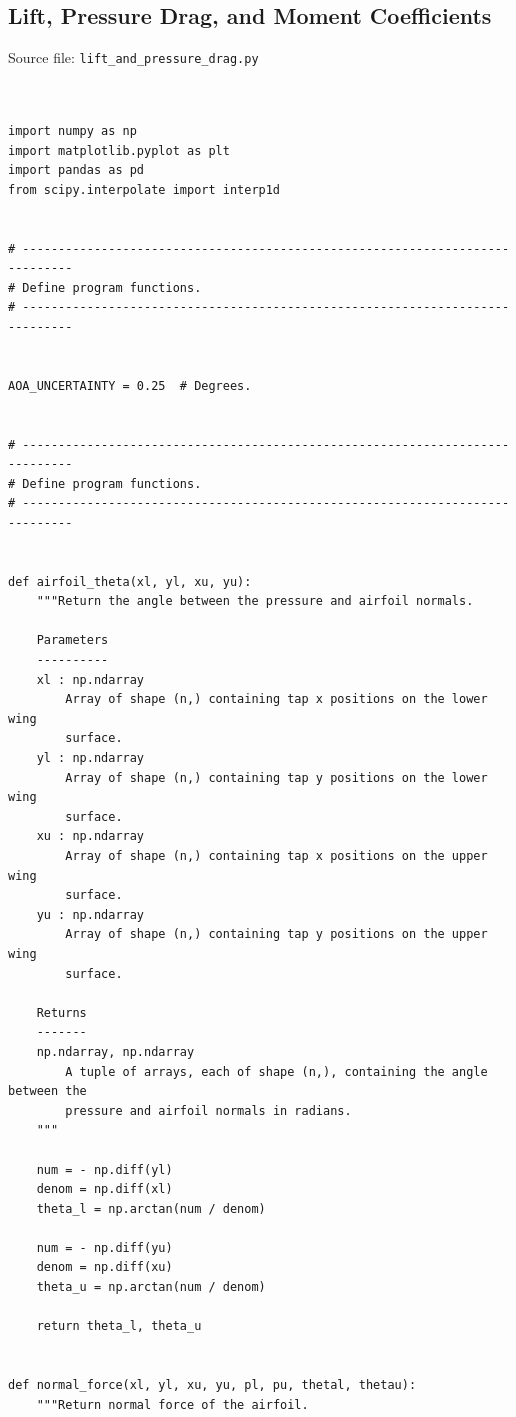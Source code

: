 \documentclass[runningheads]{llncs}
\begin{document}
\subsection{Lift, Pressure Drag, and Moment Coefficients}

Source file: \verb|lift_and_pressure_drag.py|

\begin{verbatim}


import numpy as np
import matplotlib.pyplot as plt
import pandas as pd
from scipy.interpolate import interp1d


# -----------------------------------------------------------------------------
# Define program functions.
# -----------------------------------------------------------------------------


AOA_UNCERTAINTY = 0.25  # Degrees.


# -----------------------------------------------------------------------------
# Define program functions.
# -----------------------------------------------------------------------------


def airfoil_theta(xl, yl, xu, yu):
    """Return the angle between the pressure and airfoil normals.

    Parameters
    ----------
    xl : np.ndarray
        Array of shape (n,) containing tap x positions on the lower wing
        surface.
    yl : np.ndarray
        Array of shape (n,) containing tap y positions on the lower wing
        surface.
    xu : np.ndarray
        Array of shape (n,) containing tap x positions on the upper wing
        surface.
    yu : np.ndarray
        Array of shape (n,) containing tap y positions on the upper wing
        surface.

    Returns
    -------
    np.ndarray, np.ndarray
        A tuple of arrays, each of shape (n,), containing the angle between the
        pressure and airfoil normals in radians.
    """

    num = - np.diff(yl)
    denom = np.diff(xl)
    theta_l = np.arctan(num / denom)

    num = - np.diff(yu)
    denom = np.diff(xu)
    theta_u = np.arctan(num / denom)

    return theta_l, theta_u


def normal_force(xl, yl, xu, yu, pl, pu, thetal, thetau):
    """Return normal force of the airfoil.


\end{verbatim}
\end{document}
